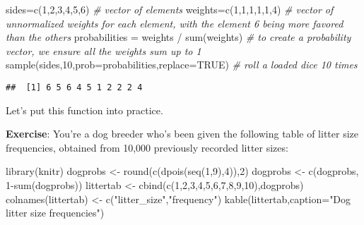 \documentclass[
]{book}
\newenvironment{Shaded}{\begin{snugshade}}{\end{snugshade}}
\newcommand{\AttributeTok}[1]{\textcolor[rgb]{0.77,0.63,0.00}{#1}}
\newcommand{\CommentTok}[1]{\textcolor[rgb]{0.56,0.35,0.01}{\textit{#1}}}
\newcommand{\ConstantTok}[1]{\textcolor[rgb]{0.00,0.00,0.00}{#1}}
\newcommand{\DecValTok}[1]{\textcolor[rgb]{0.00,0.00,0.81}{#1}}
\newcommand{\FunctionTok}[1]{\textcolor[rgb]{0.00,0.00,0.00}{#1}}
\newcommand{\NormalTok}[1]{#1}
\newcommand{\OtherTok}[1]{\textcolor[rgb]{0.56,0.35,0.01}{#1}}
\newcommand{\SpecialCharTok}[1]{\textcolor[rgb]{0.00,0.00,0.00}{#1}}
\newcommand{\StringTok}[1]{\textcolor[rgb]{0.31,0.60,0.02}{#1}}
\begin{document}
\begin{Shaded}
\begin{Highlighting}[]
\NormalTok{sides}\OtherTok{=}\FunctionTok{c}\NormalTok{(}\DecValTok{1}\NormalTok{,}\DecValTok{2}\NormalTok{,}\DecValTok{3}\NormalTok{,}\DecValTok{4}\NormalTok{,}\DecValTok{5}\NormalTok{,}\DecValTok{6}\NormalTok{) }\CommentTok{\# vector of elements}
\NormalTok{weights}\OtherTok{=}\FunctionTok{c}\NormalTok{(}\DecValTok{1}\NormalTok{,}\DecValTok{1}\NormalTok{,}\DecValTok{1}\NormalTok{,}\DecValTok{1}\NormalTok{,}\DecValTok{1}\NormalTok{,}\DecValTok{4}\NormalTok{) }\CommentTok{\# vector of unnormalized weights for each element, with the element \textquotesingle{}6\textquotesingle{} being more favored than the others}
\NormalTok{probabilities }\OtherTok{=}\NormalTok{ weights }\SpecialCharTok{/} \FunctionTok{sum}\NormalTok{(weights) }\CommentTok{\# to create a probability vector, we ensure all the weights sum up to 1}
\FunctionTok{sample}\NormalTok{(sides,}\DecValTok{10}\NormalTok{,}\AttributeTok{prob=}\NormalTok{probabilities,}\AttributeTok{replace=}\ConstantTok{TRUE}\NormalTok{) }\CommentTok{\# roll a loaded dice 10 times}
\end{Highlighting}
\end{Shaded}

\begin{verbatim}
##  [1] 6 5 6 4 5 1 2 2 2 4
\end{verbatim}

Let's put this function into practice.

\textbf{Exercise}: You're a dog breeder who's been given the following table of litter size frequencies, obtained from 10,000 previously recorded litter sizes:

\begin{Shaded}
\begin{Highlighting}[]
\FunctionTok{library}\NormalTok{(knitr)}
\NormalTok{dogprobs }\OtherTok{\textless{}{-}} \FunctionTok{round}\NormalTok{(}\FunctionTok{c}\NormalTok{(}\FunctionTok{dpois}\NormalTok{(}\FunctionTok{seq}\NormalTok{(}\DecValTok{1}\NormalTok{,}\DecValTok{9}\NormalTok{),}\DecValTok{4}\NormalTok{)),}\DecValTok{2}\NormalTok{)}
\NormalTok{dogprobs }\OtherTok{\textless{}{-}} \FunctionTok{c}\NormalTok{(dogprobs, }\DecValTok{1}\SpecialCharTok{{-}}\FunctionTok{sum}\NormalTok{(dogprobs))}
\NormalTok{littertab }\OtherTok{\textless{}{-}} \FunctionTok{cbind}\NormalTok{(}\FunctionTok{c}\NormalTok{(}\DecValTok{1}\NormalTok{,}\DecValTok{2}\NormalTok{,}\DecValTok{3}\NormalTok{,}\DecValTok{4}\NormalTok{,}\DecValTok{5}\NormalTok{,}\DecValTok{6}\NormalTok{,}\DecValTok{7}\NormalTok{,}\DecValTok{8}\NormalTok{,}\DecValTok{9}\NormalTok{,}\DecValTok{10}\NormalTok{),dogprobs)}
\FunctionTok{colnames}\NormalTok{(littertab) }\OtherTok{\textless{}{-}} \FunctionTok{c}\NormalTok{(}\StringTok{"litter\_size"}\NormalTok{,}\StringTok{"frequency"}\NormalTok{)}
\FunctionTok{kable}\NormalTok{(littertab,}\AttributeTok{caption=}\StringTok{"Dog litter size frequencies"}\NormalTok{)}
\end{Highlighting}
\end{Shaded}
\end{document}
